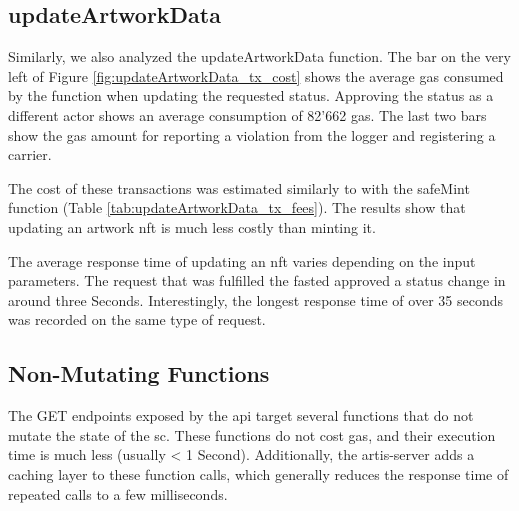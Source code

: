 \subsection*{updateArtworkData}
Similarly, we also analyzed the updateArtworkData function. The bar on the very left of Figure \ref{fig:updateArtworkData_tx_cost} shows the average gas consumed by the function when updating the requested status. Approving the status as a different actor shows an average consumption of 82'662 gas. The last two bars show the gas amount for reporting a violation from the logger and registering a carrier.

The cost of these transactions was estimated similarly to with the safeMint function (Table \ref{tab:updateArtworkData_tx_fees}). The results show that updating an artwork \gls{nft} is much less costly than minting it. 

\begin{table}[h]
\caption{Estimated transaction fees updateArtworkData}
\label{tab:updateArtworkData_tx_fees}
\end{table}

The average response time of updating an \gls{nft} varies depending on the input parameters. The request that was fulfilled the fasted approved a status change in around three Seconds. Interestingly, the longest response time of over 35 seconds was recorded on the same type of request.


\subsection*{Non-Mutating Functions}
The GET endpoints exposed by the \gls{api} target several functions that do not mutate the state of the \gls{sc}. These functions do not cost gas, and their execution time is much less (usually < 1 Second). Additionally, the artis-server adds a caching layer to these function calls, which generally reduces the response time of repeated calls to a few milliseconds.

